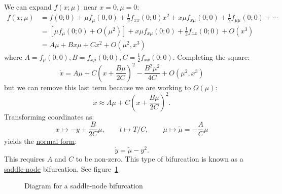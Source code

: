 \documentclass[../Main.tex]{subfiles}
\begin{document}
We can expand $f(x;\mu)$ near $x = 0, \mu = 0$:
\begin{align*}
    f(x;\mu) &= f(0;0) + \mu f_\mu(0, 0) + \frac12 f_{xx}(0;0)x^2 + x\mu f_{x\mu}(0;0) + \frac12 f_{\mu\mu}(0;0) + \cdots \\
    &= \left[\mu f_{\mu}(0; 0) + O(\mu^2)\right] + x\mu f_{x\mu}(0; 0) + \frac12 f_{xx}(0;0) + O(x^3) \\
    &= A\mu + B x\mu + Cx^2 + O(\mu^2, x^3)
\end{align*}
where $A = f_\mu(0;0), B = f_{x\mu}(0;0), C = \frac12 f_{xx}(0;0)$. Completing the square:
\begin{equation*}
    \dot{x} = A\mu + C\left(x + \frac{B\mu}{2C}\right)^2 - \frac{B^2 \mu^2}{4C} + O(\mu^2, x^3)
\end{equation*}
but we can remove this last term because we are working to $O(\mu)$:
\begin{equation*}
    \dot{x} \approx A\mu + C\left(x + \frac{B\mu}{2C}\right)^2.
\end{equation*}
Transforming coordinates as:
\begin{equation*}
    x \mapsto -y + \frac{B}{2C}\mu,\qquad t \mapsto T / C, \qquad \mu \mapsto \tilde{\mu} = -\frac{A}{C}\mu
\end{equation*}
yields the \underline{normal form}:
\begin{equation*}
    \dot{y} = \tilde\mu - y^2.
\end{equation*}
This requires $A$ and $C$ to be non-zero. This type of bifurcation is known as a \underline{saddle-node} bifurcation. See figure~\ref{figSaddleNodeBif}

\begin{figure}
    \centering
    \caption{Diagram for a saddle-node bifurcation}
    \label{figSaddleNodeBif}
\end{figure}
\end{document}
